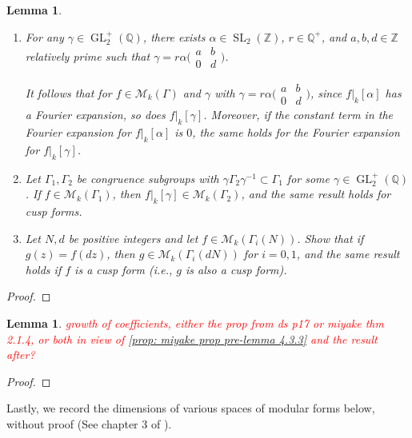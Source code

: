 \documentclass[10pt,leqno,twoside]{article}
\theoremstyle{plain}
\newtheorem{lemma}[lem]{Lemma}
\theoremstyle{definition}
\numberwithin{equation}{section}
\numberwithin{lem}{section}
\newcommand{\textib}[1]{\textbf{\textit{#1\index{#1}}}} %
\DeclareMathOperator{\GL}{GL}
\DeclareMathOperator{\SL}{SL}
\newcommand{\slz}{\SL_2(\mathbb{Z})}
\newcommand{\glqp}{\GL_2^+(\mathbb{Q})}
\newcommand{\tbd}{{\Huge\color{red}{\textib{TBD}}}}
\newcommand{\sai}[1]{\textcolor{red}{#1}}
\begin{document}
\begin{lemma}\label{lem: weight k operator properties}
    \begin{enumerate}[label = \textup{(\alph*)}]
        \item For any $\gamma\in\glqp$, there exists $\alpha\in\slz$, $r\in\mathbb Q^+$, and $a,b,d\in\mathbb Z$ relatively prime such that $\gamma = r\alpha \big(\!\begin{smallmatrix}
            a & b \\ 0 & d
        \end{smallmatrix}\!\big)$. 
    
        It follows that for $f\in\mathcal M_k(\varGamma)$ and $\gamma$ with $\gamma = r\alpha \big(\!\begin{smallmatrix}
            a & b \\ 0 & d
        \end{smallmatrix}\!\big)$, since $f|_k[\alpha]$ has a Fourier expansion, so does $f|_k[\gamma]$. Moreover, if the constant term in the Fourier expansion for $f|_k[\alpha]$ is $0$, the same holds for the Fourier expansion for $f|_k[\gamma]$.
        \item Let $\varGamma_1,\varGamma_2$ be congruence subgroups with $\gamma\varGamma_2\gamma^{-1}\subset \varGamma_1$ for some $\gamma\in\glqp$. If $f\in\mathcal M_k(\varGamma_1)$, then $f|_k[\gamma]\in\mathcal M_k(\varGamma_2)$, and the same result holds for cusp forms.
        \item Let $N,d$ be positive integers and let $f\in\mathcal M_k(\varGamma_i(N))$. Show that if $g(z) = f(dz)$, then $g\in\mathcal M_k(\varGamma_i(dN))$ for $i = 0,1$, and the same result holds if $f$ is a cusp form \textup{(}i.e., $g$ is also a cusp form\textup{)}.
    \end{enumerate}  
\end{lemma}
\begin{proof}
    \tbd
\end{proof}
\begin{lemma}\label{lem: growth of fourier coeffs}
    \sai{growth of coefficients, either the prop from ds p17 or miyake thm 2.1.4, or both in view of \cref{prop: miyake prop pre-lemma 4.3.3} and the result after?}
\end{lemma}
\begin{proof}
    \tbd
\end{proof}
Lastly, we record the dimensions of various spaces of modular forms below, without proof (See chapter 3 of \cite{diamond}).
\end{document}
